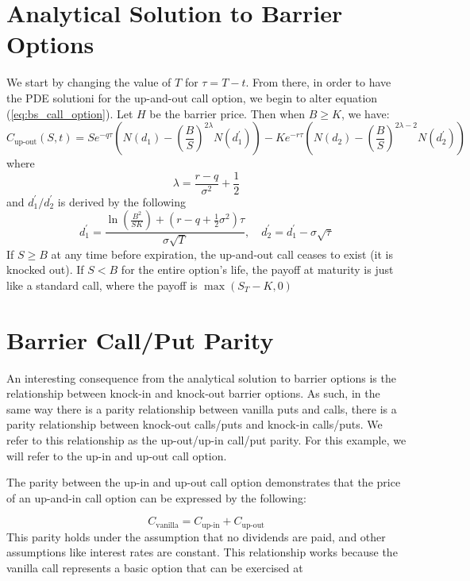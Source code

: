 \section{Analytical Solution to Barrier Options}

We start by changing the value of $T$ for $\tau=T-t$. From there, in order to have the PDE solutioni for the up-and-out call option, we begin to alter equation (\ref{eq:bs_call_option}). Let $H$ be the barrier price. Then when $B\geq K$, we have:
\begin{equation}\label{eq:DOC}
	C_{\text{up-out}}(S,t)=Se^{-q\tau}\left(N(d_1)-\left(\frac{B}{S}\right)^{2\lambda}N(d^\prime_1)\right)-Ke^{-r\tau}\left(N(d_2)-\left(\frac{B}{S}\right)^{2\lambda-2} N(d^\prime_2)\right)
\end{equation}
where
\begin{equation}
	\lambda=\frac{r-q}{\sigma^2}+\frac{1}{2}
\end{equation}
and $d^\prime_1/d^\prime_2$ is derived by the following
\begin{equation}
	d^\prime_1=\frac{\ln\left(\frac{B^2}{SK}\right)+(r-q+\tfrac{1}{2}\sigma^2)\tau}{\sigma\sqrt{T}},\quad d^\prime_2=d^\prime_1-\sigma\sqrt{\tau}
\end{equation}
If $S\geq B$ at any time before expiration, the up-and-out call ceases to exist (it is knocked out). If $S<B$ for the entire option's life, the payoff at maturity is just like a standard call, where the payoff is $\max\left(S_T-K, 0\right)$
\section{Barrier Call/Put Parity}

An interesting consequence from the analytical solution to barrier options is the relationship between knock-in and knock-out barrier options. As such, in the same way there is a parity relationship between vanilla puts and calls, there is a parity relationship between knock-out calls/puts and knock-in calls/puts. We refer to this relationship as the up-out/up-in call/put parity. For this example, we will refer to the up-in and up-out call option.

The parity between the up-in and up-out call option demonstrates that the price of an up-and-in call option can be expressed by the following:

\begin{equation}
	C_{\text{vanilla}}=C_{\text{up-in}}+C_{\text{up-out}}
\end{equation}
This parity holds under the assumption that no dividends are paid, and other assumptions like interest rates are constant. This relationship works because the vanilla call represents a basic option that can be exercised at 

